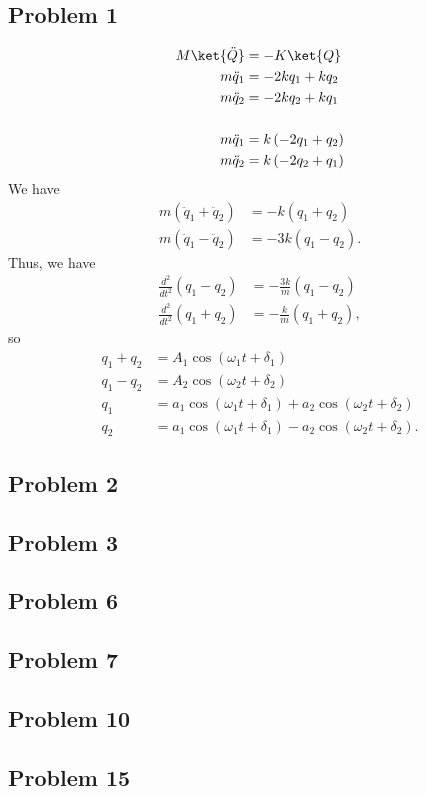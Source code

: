 \documentclass[10pt]{mypackage}
\begin{document}
\subsection{Problem 1}%
\begin{align*}
  M\ket{\ddot{Q}} &= -K\ket{Q}\\
  m\ddot{q}_1 &= -2kq_1 + kq_2\\
  m\ddot{q}_2 &= -2kq_2 + kq_1\\
  \\
  m\ddot{q}_1 &= k\left(-2q_1 + q_2\right)\\
  m\ddot{q}_2 &= k\left(-2q_2 + q_1\right)
\end{align*}
We have
\begin{align*}
  m\left(\ddot{q}_1 + \ddot{q}_2\right) &= -k\left(q_1 + q_2\right)\\
  m\left(\ddot{q}_1 - \ddot{q}_2\right) &= -3k\left(q_1 - q_2\right).
\end{align*}
Thus, we have
\begin{align*}
  \frac{d^2}{dt^2} \left(q_1 - q_2\right) &= -\frac{3k}{m}\left(q_1 - q_2\right)\\
  \frac{d^2}{dt^2} \left(q_1 + q_2\right) &= -\frac{k}{m}\left(q_1 + q_2\right),
\end{align*}
so
\begin{align*}
  q_1 + q_2 &= A_1\cos\left(\omega_1t + \delta_1\right)\\
  q_1 - q_2 &= A_2\cos\left(\omega_2 t + \delta_2\right)\\
  q_1 &= a_1\cos\left(\omega_1 t + \delta_1\right) + a_2\cos\left(\omega_2 t + \delta_2\right)\\
  q_2 &= a_1\cos\left(\omega_1 t + \delta_1\right) - a_2\cos\left(\omega_2 t + \delta_2\right).
\end{align*}

\subsection{Problem 2}%

\subsection{Problem 3}%
\subsection{Problem 6}%
\subsection{Problem 7}%
\subsection{Problem 10}%
\subsection{Problem 15}%
\end{document}
